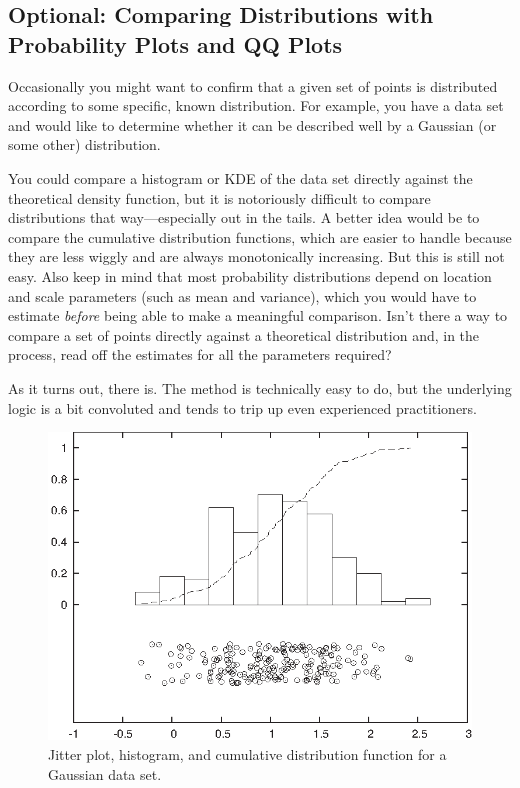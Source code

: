\vspace*{-6pt}
\subsection{Optional: Comparing Distributions with Probability Plots and QQ Plots}


Occasionally you might want to confirm that a given set of points 
is distributed according to some specific, known distribution. For
example, you have a data set and would like to determine whether it
can be described well by a Gaussian (or some other) distribution.

You could compare a histogram or KDE of the data set directly against
the theoretical density function, but it is notoriously difficult to
compare distributions that way---especially out in the tails.  A
better idea would be to compare the cumulative distribution functions,
which are easier to handle because they are less wiggly and are always
monotonically increasing. But this is still not easy. Also keep in
mind that most probability distributions depend on location and scale
parameters (such as mean and variance), which you would have to
estimate \emph{before} being able to make a meaningful comparison.
Isn't there a way to compare a set of points directly against a
theoretical distribution and, in the process, read off the estimates
for all the parameters required?

As it turns out, there is. The method is technically easy to do, but
the underlying logic is a bit convoluted and tends to trip up even
experienced practitioners.


\begin{figure}
  \centerline{\includegraphics{img/happyqq1}}
  \caption{Jitter plot, histogram, and cumulative distribution function
    for a Gaussian data set.}
  \label{fig:happyqq1}
\end{figure}

